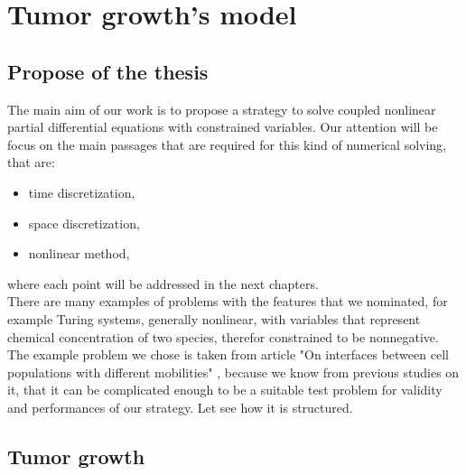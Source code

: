 \chapter{Tumor growth's model}
\section{Propose of the thesis}
The main aim of our work is to propose a strategy to solve coupled nonlinear partial differential equations with constrained variables. Our attention will be focus on the main passages that are required for this kind of numerical solving, that are:
\begin{itemize}
	\item time discretization,
	\item space discretization,
	\item nonlinear method,
\end{itemize}  
where each point will be addressed in the next chapters. \\
There are many examples of problems with the features that we nominated, for example Turing systems, generally nonlinear, with variables that represent chemical concentration of two species, therefor constrained to be nonnegative. \\
The example problem we chose is taken from article "On interfaces between cell populations with different mobilities" \cite{tumor_growth}, because we know from previous studies on it, that it can be complicated enough to be a suitable test problem for validity and performances of our strategy.
Let see how it is structured. 
\section{Tumor growth}
